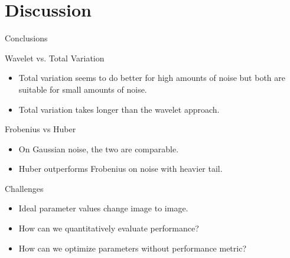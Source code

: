 \documentclass[12pt]{beamer}
\begin{document}
\section{Discussion}


\begin{frame}{Conclusions}

\begin{block}{Wavelet vs. Total Variation}
\begin{itemize}
\item Total variation seems to do better for high amounts of noise but both are suitable for small amounts of  noise. \\
\item Total variation takes longer than the wavelet approach. \\
\end{itemize}
\end{block}

\begin{block}{Frobenius vs Huber}
\begin{itemize}
\item On Gaussian noise, the two are comparable.
\item Huber outperforms Frobenius on noise with heavier tail.
\end{itemize}
\end{block}

\begin{block}{Challenges}
\begin{itemize}
\item Ideal parameter values change image to image.
\item How can we quantitatively evaluate performance?
\item How can we optimize parameters without performance metric?
\end{itemize}
\end{block}

\end{frame}
\end{document}
